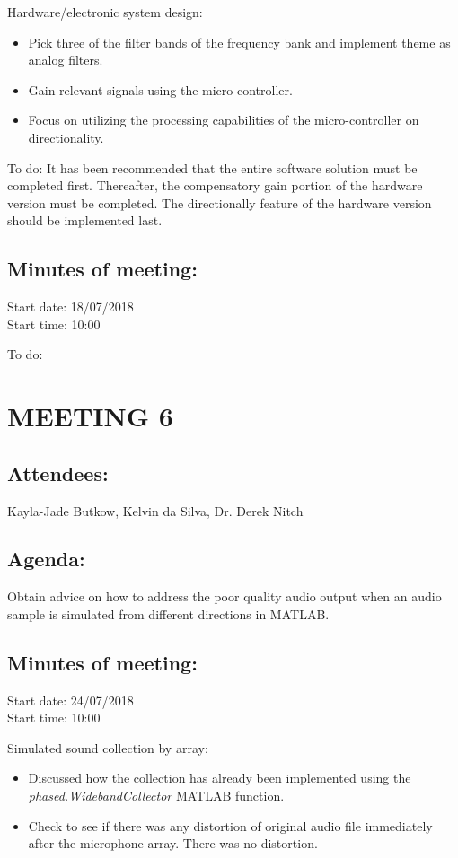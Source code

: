 \documentclass[10pt,onecolumn]{witseiepaper}
\begin{document}
Hardware/electronic system design:
\begin{itemize}
	\item Pick three of the filter bands of the frequency bank and implement theme as analog filters.
	\item Gain relevant signals using the micro-controller.
	\item Focus on utilizing the processing capabilities of the micro-controller on directionality.
\end{itemize}

To do:
It has been recommended that the entire software solution must be completed first. Thereafter, the compensatory gain portion of the hardware version must be completed. The directionally feature of the hardware version should be implemented last.


\subsection*{Minutes of meeting:}
Start date: 18/07/2018 \\
Start time: 10:00


To do:

\section*{MEETING 6}
\subsection*{Attendees:}
Kayla-Jade Butkow, Kelvin da Silva, Dr. Derek Nitch
\subsection*{Agenda:} 
Obtain advice on how to address the poor quality audio output when an audio sample is simulated from different directions in MATLAB.

\subsection*{Minutes of meeting:}
Start date: 24/07/2018 \\
Start time: 10:00

Simulated sound collection by array:
\begin{itemize}
	\item Discussed how the collection has already been implemented using the \textit{phased.WidebandCollector} MATLAB function.
	\item Check to see if there was any distortion of original audio file immediately after the microphone array. There was no distortion.
\end{itemize}
\end{document}
